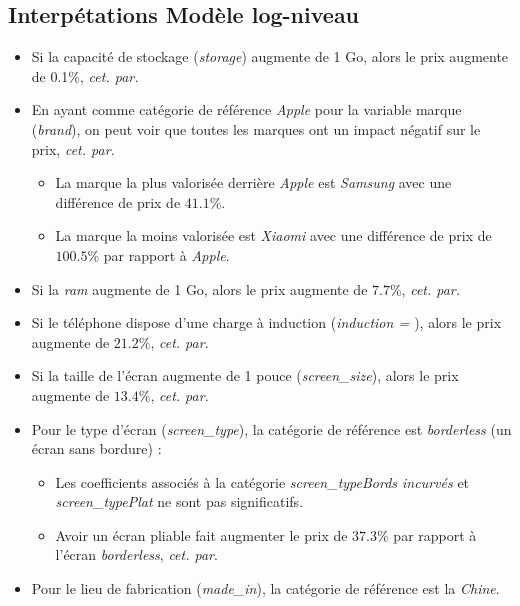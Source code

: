 \documentclass[
  12pt,
]{report}
\providecommand{\tightlist}{%
  \setlength{\itemsep}{0pt}\setlength{\parskip}{0pt}}\usepackage{longtable,booktabs,array}
\renewcommand{\texttt}[1]{\colorbox{light}{\color{highlight}{\ttfamily{#1}}}}
\begin{document}
\newpage

\subsection{Interpétations Modèle
log-niveau}\label{interpuxe9tations-moduxe8le-log-niveau}

\begin{itemize}
\item
  Si la capacité de stockage (\emph{storage}) augmente de 1 Go, alors le
  prix augmente de 0.1\%, \emph{cet. par.}
\item
  En ayant comme catégorie de référence \emph{Apple} pour la variable
  marque (\emph{brand}), on peut voir que toutes les marques ont un
  impact négatif sur le prix, \emph{cet. par.}

  \begin{itemize}
  \tightlist
  \item
    La marque la plus valorisée derrière \emph{Apple} est \emph{Samsung}
    avec une différence de prix de \(41.1\%\).
  \item
    La marque la moins valorisée est \emph{Xiaomi} avec une différence
    de prix de \(100.5\%\) par rapport à \emph{Apple}.
  \end{itemize}
\item
  Si la \emph{ram} augmente de 1 Go, alors le prix augmente de
  \(7.7\%\), \emph{cet. par.}
\item
  Si le téléphone dispose d'une charge à induction (\emph{induction =
  \texttt{TRUE}}), alors le prix augmente de \(21.2\%\), \emph{cet.
  par.}
\item
  Si la taille de l'écran augmente de 1 pouce (\emph{screen\_size}),
  alors le prix augmente de \(13.4\%\), \emph{cet. par.}
\item
  Pour le type d'écran (\emph{screen\_type}), la catégorie de référence
  est \emph{borderless} (un écran sans bordure) :

  \begin{itemize}
  \tightlist
  \item
    Les coefficients associés à la catégorie \emph{screen\_typeBords
    incurvés} et \emph{screen\_typePlat} ne sont pas significatifs.
  \item
    Avoir un écran pliable fait augmenter le prix de \(37.3\%\) par
    rapport à l'écran \emph{borderless}, \emph{cet. par}.
  \end{itemize}
\item
  Pour le lieu de fabrication (\emph{made\_in}), la catégorie de
  référence est la \emph{Chine}.


\end{itemize}
\end{document}
